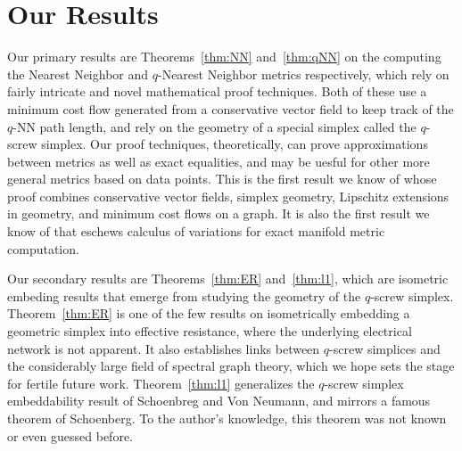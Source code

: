 \section{Our Results}
Our primary results are Theorems~\ref{thm:NN} and~\ref{thm:qNN} on the
computing the Nearest Neighbor and $q$-Nearest Neighbor metrics
respectively, which rely
on fairly intricate and novel mathematical proof techniques. Both of these
use a minimum cost flow generated from a conservative vector field to keep
track of the $q$-NN path length, and rely on the geometry of a special
simplex called the
$q$-screw simplex. Our proof techniques, theoretically, can prove
approximations between metrics as well as exact equalities, and may be
uesful for other more general metrics based on data points. This is the
first result we know of whose proof combines
conservative vector fields, simplex geometry, Lipschitz extensions in
geometry, and minimum cost flows on a graph. It is also the first result we
know of that eschews calculus of variations for exact manifold metric
computation.

Our secondary results are Theorems~\ref{thm:ER} and~\ref{thm:l1}, which are
isometric embeding results that emerge from studying the geometry of the
$q$-screw simplex. 
Theorem~\ref{thm:ER} is one of the few results on isometrically embedding a
geometric simplex into effective resistance, where the underlying
electrical network is not apparent. It also establishes links between
$q$-screw simplices and the considerably large field of spectral graph theory,
which we hope sets the stage for fertile future work.
Theorem~\ref{thm:l1} generalizes the $q$-screw simplex embeddability result
of Schoenbreg and Von Neumann, and mirrors a famous theorem of Schoenberg.
To the author's knowledge, this theorem was not known or even guessed
before.

